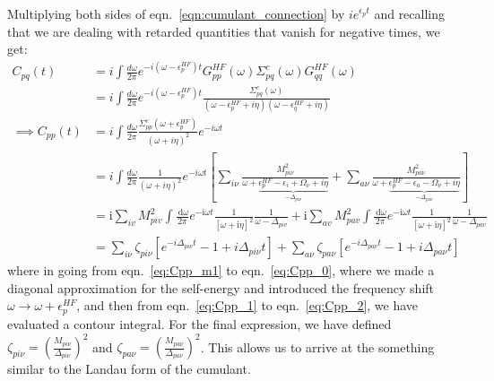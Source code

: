 Multiplying both sides of eqn.~\ref{eqn:cumulant_connection} by $ie^{\epsilon_p t} $ and recalling that we are dealing with retarded quantities that vanish for negative times, we get:
\begin{align}
	C_{pq}(t) &= i \int \frac{d\omega}{2\pi} e^{-i(\omega-\epsilon_p^{HF})t} G_{pp}^{HF}(\omega) \Sigma_{pq}^c(\omega) G_{qq}^{HF}(\omega) \\
&= i \int \frac{d\omega}{2\pi} e^{-i(\omega-\epsilon_p^{HF})t} \frac{\Sigma_{pq}^c(\omega)}{(\omega - \epsilon_p^{HF} + i\eta)(\omega - \epsilon_q^{HF} + i\eta)} 
\label{eq:Cpp_m1}\\
\implies C_{pp}(t) &= i \int \frac{d\omega}{2\pi} \frac{ \Sigma_{pp}^c\left(\omega+\epsilon_p^{HF}\right)}{(\omega + i \eta)^2} e^{-i \omega t}
\label{eq:Cpp_0} \\
&= i \int \frac{d\omega}{2\pi} \frac{1}{(\omega + i \eta)^2} e^{-i \omega t} \left[ \sum_{i\nu} \frac{M_{pi\nu}^2}{\omega + \underbrace{\epsilon_p^{HF} - \epsilon_i + \Omega_\nu + i \eta}_{-\Delta_{pi\nu}}} + \sum_{a\nu} \frac{M_{pa\nu}^2}{\omega + \underbrace{\epsilon_p^{HF} - \epsilon_a - \Omega_\nu + i \eta}_{-\Delta_{pa\nu}}} \right] \\
& =\mathrm{i} \sum_{i v} M_{p i v}^2 \int \frac{\mathrm{~d} \omega}{2 \pi} e^{-\mathrm{i} \omega t} \frac{1}{[\omega+\mathrm{i} \eta]^2} \frac{1}{\omega-\Delta_{p i v}} +\mathrm{i} \sum_{a v} M_{p a v}^2 \int \frac{\mathrm{~d} \omega}{2 \pi} e^{-\mathrm{i} \omega t} \frac{1}{[\omega+\mathrm{i} \eta]^2} \frac{1}{\omega-\Delta_{p a v}}
\label{eq:Cpp_1}
\\
&= \sum_{i\nu} \zeta_{pi\nu} \left[ e^{-i\Delta_{pi\nu} t} - 1 + i\Delta_{pi\nu} t \right] + \sum_{a\nu} \zeta_{pa\nu} \left[ e^{-i\Delta_{pa\nu} t} - 1 + i\Delta_{pa\nu} t \right]
\label{eq:Cpp_2}
\end{align}
where in going from eqn.~\ref{eq:Cpp_m1} to eqn.~\ref{eq:Cpp_0}, where we made a diagonal approximation for the self-energy and introduced the frequency shift $\omega \to \omega + \epsilon_p^{HF}$, and then from eqn.~\ref{eq:Cpp_1} to eqn.~\ref{eq:Cpp_2}, we have evaluated a contour integral. For the final expression, we have defined $\zeta_{pi\nu} = \left(\frac{M_{pi\nu}}{\Delta_{pi\nu}}\right)^2$ and $\zeta_{pa\nu} = \left(\frac{M_{pa\nu}}{\Delta_{pa\nu}}\right)^2$. This allows us to arrive at the something similar to the Landau form of the cumulant.
